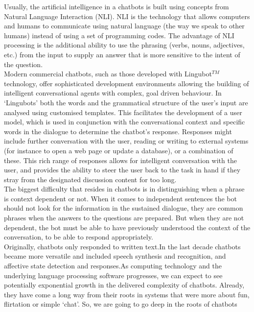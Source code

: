 \documentclass[12pt,twoside]{article}
\theoremstyle{plain}
\theoremstyle{definition}
\theoremstyle{remark}
\begin{document}
 Usually, the artificial intelligence in a chatbots is built using concepts from Natural Language Interaction (NLI). NLI is the technology that allows computers and humans to communicate using natural language (the way we speak to other humans) instead of using a set of programming codes. The advantage of NLI processing is the additional ability to use the phrasing (verbs, nouns, adjectives, etc.) from the input to supply an answer that is more sensitive to the intent of the question.\\
 
 Modern commercial chatbots, such as those developed with Lingubot$^{TM}$ \cite{lingubot2004creative} technology, offer sophisticated development environments allowing the building of intelligent conversational agents with complex, goal driven behaviour. In ‘Lingubots’ both the words and the grammatical structure of the user’s input are analysed using customised templates. This facilitates the development of a user model, which is used in conjunction with the conversational context and specific words in the dialogue to determine the chatbot’s response. Responses might include further conversation with the user, reading or writing to external systems (for instance to open a web page or update a database), or a combination of these. This rich range of responses allows for intelligent conversation with the user, and provides the ability to steer the user back to the task in hand if they stray from the designated discussion content for too long.  \\
 
The biggest difficulty that resides in chatbots is in distinguishing when a phrase is context dependent or not. When it comes to independent sentences the bot should not look for the information in the sustained dialogue, they are common phrases when the answers to the questions are prepared. But when they are not dependent, the bot must be able to have previously understood the context of the conversation, to be able to respond appropriately.\\
 
	 Originally, chatbots only responded to written text.In the last decade chatbots became more versatile and included speech synthesis and recognition,
and affective state detection and responses.As computing technology and the underlying language processing software progresses, we can expect to see potentially exponential growth in the delivered complexity of chatbots. Already, they have come a long way from their roots in systems that were more about fun, flirtation or simple ‘chat’. So, we are going to go deep in the roots of chatbots\\
 
\end{document}
